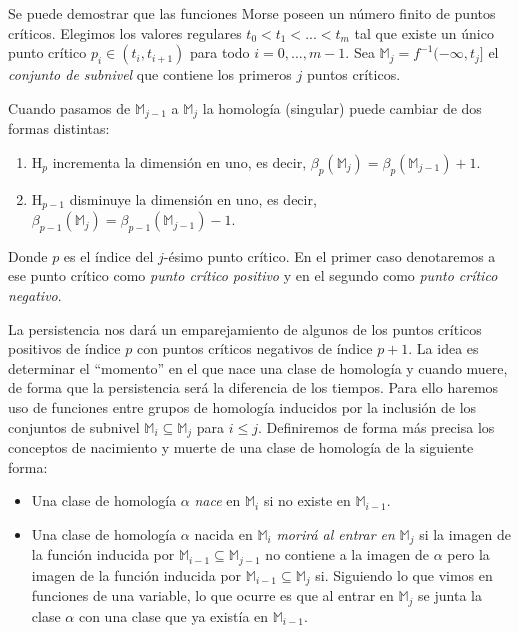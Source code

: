 \begin{sloppypar}
Se puede demostrar que las funciones Morse poseen un número finito de puntos críticos. Elegimos los valores regulares $t_0 < t_1 < ... < t_m$ tal que existe un único punto crítico ${p_i \in (t_i, t_{i+1})}$ para todo $i = 0, ..., m-1$. Sea $\mathbb{M}_j=f^{-1}(-\infty, t_j]$ el \emph{conjunto de subnivel} que contiene los primeros $j$ puntos críticos.
\end{sloppypar}

Cuando pasamos de $\mathbb{M}_{j-1}$ a $\mathbb{M}_j$ la homología (singular) puede cambiar de dos formas distintas:
\begin{enumerate}[label=\Alph*)]
	\item $\text{H}_p$ incrementa la dimensión en uno, es decir, ${\beta_p(\mathbb{M}_j)} = \beta_p(\mathbb{M}_{j-1}) + 1$.
	\item $\text{H}_{p-1}$ disminuye la dimensión en uno, es decir, ${\beta_{p-1}(\mathbb{M}_j)} = \beta_{p-1}(\mathbb{M}_{j-1}) - 1$.
\end{enumerate}
Donde $p$ es el índice del $j$-ésimo punto crítico. En el primer caso denotaremos a ese punto crítico como \emph{punto crítico positivo} y en el segundo como \emph{punto crítico negativo}.

La persistencia nos dará un emparejamiento de algunos de los puntos críticos positivos de índice $p$ con puntos críticos negativos de índice $p+1$. La idea es determinar el ``momento'' en el que nace una clase de homología y cuando muere, de forma que la persistencia será la diferencia de los tiempos. Para ello haremos uso de funciones entre grupos de homología inducidos por la inclusión de los conjuntos de subnivel $\mathbb{M}_i \subseteq \mathbb{M}_j$ para $i \leq j$. Definiremos de forma más precisa los conceptos de nacimiento y muerte de una clase de homología de la siguiente forma:

\begin{itemize}
	\item Una clase de homología $\alpha$ \emph{nace} en $\mathbb{M}_i$ si no existe en $\mathbb{M}_{i-1}$.
	\item Una clase de homología $\alpha$ nacida en $\mathbb{M}_i$ \emph{morirá al entrar en} $\mathbb{M}_j$ si la imagen de la función inducida por $\mathbb{M}_{i-1} \subseteq \mathbb{M}_{j-1}$ no contiene a la imagen de $\alpha$ pero la imagen de la función inducida por $\mathbb{M}_{i-1} \subseteq \mathbb{M}_j$ si. Siguiendo lo que vimos en funciones de una variable, lo que ocurre es que al entrar en $\mathbb{M}_j$ se junta la clase $\alpha$ con una clase que ya existía en $\mathbb{M}_{i-1}$.
\end{itemize}

